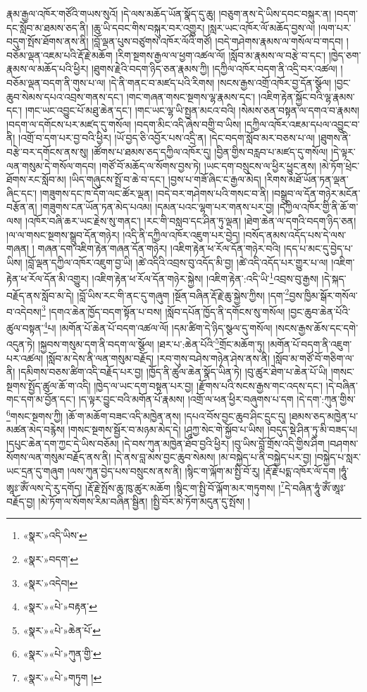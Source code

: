 རྣམ་རྒྱལ་འཁོར་གཙོའི་གཡས་སུའོ། །དེ་ལས་མཆོད་ཡོན་སྣོད་དུ་ཆུ། །བཅུག་ནས་དེ་ཡིས་དབང་བསྐུར་ན། །བདག་དང་སློབ་མ་ཐམས་ཅད་ནི། །ཆུ་ཡི་དབང་གིས་བསྐུར་བར་འགྱུར། །སླར་ཡང་འཁོར་ལོ་མཆོད་བྱས་ལ། །ལག་པར་བདུག་སྤོས་ཐོགས་ནས་ནི། །བློ་ལྡན་པུས་བཙུགས་འཁོར་ལོའི་གཙོ། །བདེ་གཤེགས་རྣམས་ལ་གསོལ་བ་གདབ། །བཅོམ་ལྡན་འཇམ་པའི་རྡོ་རྗེ་མཆོག །རིག་སྔགས་རྒྱལ་ལ་ཕྱག་འཚལ་ལོ། །སློབ་མ་རྣམས་ལ་བརྩེ་བ་དང་། །ཁྱེད་ཅག་རྣམས་ལ་མཆོད་པའི་ཕྱིར། །ཐུགས་རྗེའི་བདག་ཉིད་ཅན་རྣམས་ཀྱི། །དཀྱིལ་འཁོར་བདག་ནི་འདྲི་བར་འཚལ། །བཅོམ་ལྡན་བདག་ནི་གུས་པ་ལ། །དེ་ནི་གནང་བ་མཛད་པའི་རིགས། །སངས་རྒྱས་འགྲོ་འཁོར་བྱ་དོན་སྩོལ། །བྱང་ཆུབ་སེམས་དཔའ་འབྲས་གནས་དང་། །གང་གཞན་གསང་སྔགས་ལྷ་རྣམས་དང་། །འཇིག་རྟེན་སྐྱོང་བའི་ལྷ་རྣམས་དང་། །གང་ཡང་འབྱུང་པོ་མཐུ་ཆེན་དང་། །གང་ཡང་ལྷ་ཡི་སྤྱན་མངའ་བའི། །སེམས་ཅན་བསྟན་ལ་དགའ་བ་རྣམས། །བདག་ལ་དགོངས་པར་མཛད་དུ་གསོལ། །བདག་མིང་འདི་ཞེས་བགྱི་བ་ཡིས། །དཀྱིལ་འཁོར་འཇམ་དཔལ་འབྱུང་བ་ནི། །འགྲོ་བ་དག་པར་བྱ་བའི་ཕྱིར། །ཡོ་བྱད་ཅི་འབྱོར་པས་འདྲི་ན། །དེང་བདག་སློབ་མར་བཅས་པ་ལ། །ཐུགས་ནི་བརྩེ་བར་དགོངས་ནས་སུ། །ཚོགས་པ་ཐམས་ཅད་དཀྱིལ་འཁོར་དུ། །བྱིན་གྱིས་བརླབ་པ་མཛད་དུ་གསོལ། །དེ་ལྟར་ལན་གསུམ་དེ་གསོལ་གདབ། །གཙོ་བོ་མཆོད་ལ་སོགས་བྱས་ཏེ། །ཡང་དག་བསྲུངས་ལ་ཕྱིར་ཕྱུང་ནས། །མེ་ཏོག་ཕྲེང་ཐོགས་རང་སློབ་མ། །ཡིད་གཞུངས་སྤྲོ་བ་ཆེ་བ་དང་། །བྱས་པ་གཟོ་ཞིང་ང་རྒྱལ་མེད། །རིགས་མཐོ་ཡོན་ཏན་ལྡན་ཞིང་དང་། །གཟུགས་དང་ཁ་དོག་ལང་ཚོར་ལྡན། །བདེ་བར་གཤེགས་པའི་གསང་བ་ནི། །བསྒྲུབ་ལ་དོན་གཉེར་མངོན་བརྩོན་ན། །གཟུགས་ངན་ཡོན་ཏན་མེད་པའམ། །དམན་པའང་ལྷག་པར་གནས་པར་བྱ། །དཀྱིལ་འཁོར་གྱི་ནི་ཆོ་ག་ལས། །འཁོར་བཞི་ཆར་ཡང་རྗེས་སུ་གནང་། །རང་གི་བསླབ་དང་ཤིན་ཏུ་ལྡན། །ཐེག་ཆེན་ལ་དགའི་བདག་ཉིད་ཅན། །ལ་ལ་གསང་སྔགས་སྒྲུབ་དོན་གཉེར། །འདི་ནི་དཀྱིལ་འཁོར་འཇུག་པར་བྱེད། །བསོད་ནམས་འདོད་པས་དེ་ལས་གཞན། །
གཞན་དག་འཇིག་རྟེན་གཞན་དོན་གཉེར། །འཇིག་རྟེན་ཕ་རོལ་དོན་གཉེར་བའི། །དད་པ་མང་དུ་བྱེད་པ་ཡིས། །བློ་ལྡན་དཀྱིལ་འཁོར་འཇུག་བྱ་ཡི། །ཚེ་འདིའི་འབྲས་བུ་འདོད་མི་བྱ། །ཚེ་འདི་འདོད་པར་གྱུར་པ་ལ། །འཇིག་རྟེན་ཕ་རོལ་དོན་མི་འགྱུར། །འཇིག་རྟེན་ཕ་རོལ་དོན་གཉེར་སྐྱེས། །འཇིག་རྟེན་:འདི་ཡི་\footnote{«སྣར་»འདི་ཡིས་}འབྲས་བུ་རྒྱས། །དེ་སྐད་བརྗོད་ནས་སློབ་མ་དེ། །བློ་ཡིས་རང་གི་ནང་དུ་གཞུག །སྔོན་བཞིན་རྡོ་རྗེ་ཆུ་སྐྱེས་ཀྱིས། །དག་\footnote{«སྣར་»བདག་}བྱས་ཁྱིམ་སྒོར་གསོལ་བ་འདེབས།\footnote{«སྣར་»འདེབ།} །དགའ་ཆེན་ཁྱོད་བདག་སྟོན་པ་བས། །སློབ་དཔོན་ཁྱོད་ནི་དགོངས་སུ་གསོལ། །བྱང་ཆུབ་ཆེན་པོའི་ཚུལ་བསྟན་\footnote{«སྣར་»«པེ་»བརྟན་}པ། །མགོན་པོ་ཆེན་པོ་བདག་འཚལ་ལོ། །དམ་ཚིག་དེ་ཉིད་སྩལ་དུ་གསོལ། །སངས་རྒྱས་ཆོས་དང་དགེ་འདུན་ཏེ། །སྐྱབས་གསུམ་དག་ནི་བདག་ལ་སྩོལ། །ཐར་པ་:ཆེན་པོའི་\footnote{«སྣར་»«པེ་»ཆེན་པོ་}གྲོང་མཆོག་ཏུ། །མགོན་པོ་བདག་ནི་འཇུག་པར་འཚལ། །སློབ་མ་དེས་ནི་ལན་གསུམ་བརྗོད། །རབ་གུས་བཤེས་གཉེན་ཤེས་ནས་ནི། །སློབ་མ་གཙོ་བོ་གཅིག་ལ་ནི། །དམིགས་བཅས་ཚིག་འདི་བརྗོད་པར་བྱ། །ཁྱོད་ནི་ཚུལ་ཆེན་སྣོད་ཡིན་ཏེ། །བུ་ཚུར་ཐེག་པ་ཆེན་པོ་ཡི། །གསང་སྔགས་སྤྱོད་ཚུལ་ཆོ་ག་འདི། །ཁྱེད་ལ་ཡང་དག་བསྟན་པར་བྱ། །རྫོགས་པའི་སངས་རྒྱས་གང་འདས་དང་། །དེ་བཞིན་གང་དག་མ་བྱོན་དང་། །ད་ལྟར་བྱུང་བའི་མགོན་པོ་རྣམས། །འགྲོ་ལ་ཕན་ཕྱིར་བཞུགས་པ་དག །དེ་དག་:ཀུན་གྱིས་\footnote{«སྣར་»«པེ་»ཀུན་གྱི་}གསང་སྔགས་ཀྱི། །ཆོ་ག་མཆོག་བཟང་འདི་མཁྱེན་ནས། །དཔའ་བོས་བྱང་ཆུབ་ཤིང་དྲུང་དུ། །ཐམས་ཅད་མཁྱེན་པ་མཚན་མེད་བརྙེས། །གསང་སྔགས་སྦྱོར་བ་མཉམ་མེད་དེ། །ཤཱཀྱ་སེང་གེ་སྐྱོབ་པ་ཡིས། །བདུད་སྡེ་ཤིན་ཏུ་མི་བཟད་པ། །དཔུང་ཆེན་དག་ཀྱང་དེ་ཡིས་བཅོམ། །དེ་བས་ཀུན་མཁྱེན་ཐོབ་བྱའི་ཕྱིར། །བུ་ཡིས་བློ་གྲོས་འདི་གྱིས་ཤིག །བཤགས་སོགས་ལན་གསུམ་བརྗོད་ནས་ནི། །དེ་ནས་བླ་མས་བྱང་ཆུབ་སེམས། །མ་བསྐྱེད་པ་ནི་བསྐྱེད་པར་བྱ། །བསྐྱེད་པ་སླར་ཡང་དྲན་དུ་གཞུག །ལས་ཀུན་བྱེད་པས་བསྲུངས་ནས་ནི། །སྙིང་ག་ལྐོག་མ་སྤྱི་བོ་རུ། །རྡོ་རྗེ་པདྨ་འཁོར་ལོ་དག །ཧཱུཾ་ཨཱཿ་ཨོཾ་ལས་དེ་རུ་དགོད། །རྡོ་རྗེ་སྤོས་ཆུ་ཁུ་ཚུར་མཆོག །སྙིང་ག་སྤྱི་བོ་ལྐོག་མར་གཏུགས། །\footnote{«སྣར་»«པེ་»གཏུག །}དེ་བཞིན་ཧཱུཾ་ཨོཾ་ཨཱཿ་བརྗོད་བྱ། །མེ་ཏོག་ལ་སོགས་རིམ་བཞིན་སྦྱིན། །སྤྱི་བོར་མེ་ཏོག་མདུན་དུ་སྤོས། །
